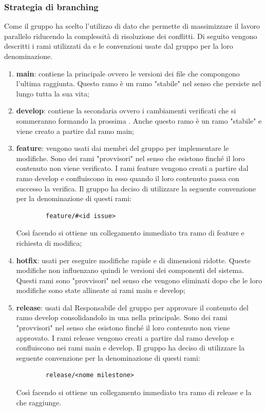 \subsubsection{Strategia di branching}
\label{subsub:branching}
Come  il gruppo ha scelto l'utilizzo di  dato che permette di massimizzare il lavoro parallelo riducendo la complessità di risoluzione dei conflitti.
Di seguito vengono descritti i rami utilizzati da  e le convenzioni usate dal gruppo per la loro denominazione.
\begin{enumerate}

    \item \textbf{main}: contiene la  principale ovvero le versioni dei file che compongono l'ultima  raggiunta.
    Questo ramo è un ramo "stabile" nel senso che persiste nel  lungo tutta la sua vita;

    \item \textbf{develop}: contiene la  secondaria ovvero i cambiamenti verificati che si sommeranno formando la prossima .
    Anche questo ramo è un ramo "stabile" e viene creato a partire dal ramo main;

    \item \textbf{feature}: vengono usati dai membri del gruppo per implementare le modifiche.
    Sono dei rami "provvisori" nel senso che esistono finché il loro contenuto non viene verificato.
    I rami feature vengono creati a partire dal ramo develop e confluiscono in esso quando il loro contenuto passa con successo la verifica.
    Il gruppo ha deciso di utilizzare la seguente convenzione per la denominazione di questi rami:
    \begin{lstlisting}
        feature/#<id issue>
    \end{lstlisting}
    Così facendo si ottiene un collegamento immediato tra ramo di feature e richiesta di modifica;

    \item \textbf{hotfix}: usati per eseguire modifiche rapide e di dimensioni ridotte.
    Queste modifiche non influenzano quindi le versioni dei componenti del sistema.
    Questi rami sono "provvisori" nel senso che vengono eliminati dopo che le loro modifiche sono state allineate ai rami main e develop;


    \item \textbf{release}: usati dal Responsabile del gruppo per approvare il contenuto del ramo develop consolidandolo in una  nella  principale.
    Sono dei rami "provvisori" nel senso che esistono finché il loro contenuto non viene approvato.
    I rami release vengono creati a partire dal ramo develop e confluiscono nei rami main e develop.
    Il gruppo ha deciso di utilizzare la seguente convenzione per la denominazione di questi rami:
    \begin{lstlisting}
        release/<nome milestone>
    \end{lstlisting}
    Così facendo si ottiene un collegamento immediato tra ramo di release e la  che raggiunge.
\end{enumerate}
